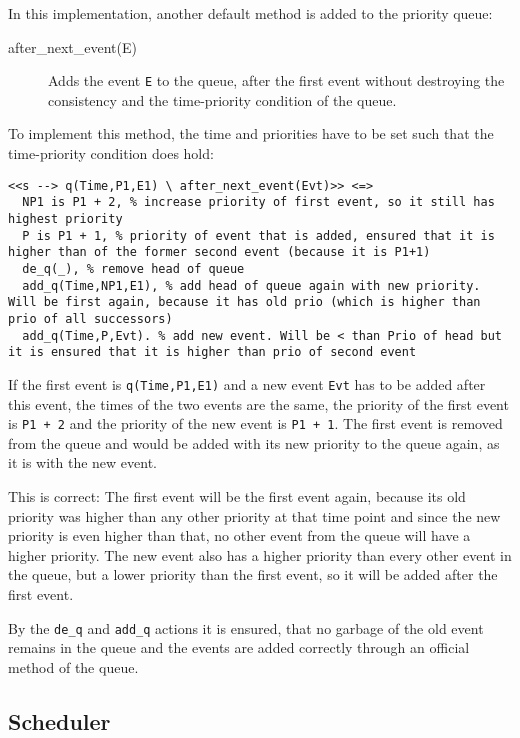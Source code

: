 In this implementation, another default method is added to the priority queue: 

\begin{description}
 \item[after\_next\_event(E)] Adds the event \lstinline|E| to the queue, after the first event without destroying the consistency and the time-priority condition of the queue.
\end{description}

To implement this method, the time and priorities have to be set such that the time-priority condition does hold:

\begin{lstlisting}
<<s --> q(Time,P1,E1) \ after_next_event(Evt)>> <=> 
  NP1 is P1 + 2, % increase priority of first event, so it still has highest priority
  P is P1 + 1, % priority of event that is added, ensured that it is higher than of the former second event (because it is P1+1)
  de_q(_), % remove head of queue
  add_q(Time,NP1,E1), % add head of queue again with new priority. Will be first again, because it has old prio (which is higher than prio of all successors)
  add_q(Time,P,Evt). % add new event. Will be < than Prio of head but it is ensured that it is higher than prio of second event
\end{lstlisting}

If the first event is \lstinline|q(Time,P1,E1)| and a new event \lstinline|Evt| has to be added after this event, the times of the two events are the same, the priority of the first event is \lstinline|P1 + 2| and the priority of the new event is \lstinline|P1 + 1|. The first event is removed from the queue and would be added with its new priority to the queue again, as it is with the new event. 

This is correct: The first event will be the first event again, because its old priority was higher than any other priority at that time point and since the new priority is even higher than that, no other event from the queue will have a higher priority. The new event also has a higher priority than every other event in the queue, but a lower priority than the first event, so it will be added after the first event.

By the \lstinline|de_q| and \lstinline|add_q| actions it is ensured, that no garbage of the old event remains in the queue and the events are added correctly through an official method of the queue.

\subsection{Scheduler}

